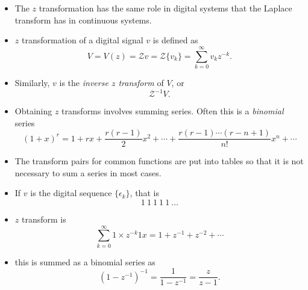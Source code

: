 \def\FileDate{98/11/04}
\def\FileVersion{1.0}

\begin{slide}\label{slide:l8s1}
\begin{itemize}
 \item The $z$ transformation has the same role in digital systems
 that the Laplace transform has in continuous systems.
 \item $z$ transformation of a digital signal $v$ is defined as \[V =
 V(z) = \mathcal{Z} v = \mathcal{Z} \{ v_{k} \}=\sum_{k=0}^{\infty}
 v_k z^{-k}.\] 

 \item Similarly, $v$ is the \emph{inverse $z$
 transform} of $V$, or
   \[\mathcal{Z}^{-1} V.\]

\end{itemize}

\end{slide}


\begin{slide}\label{slide:l8s1a}

\begin{itemize}

\item Obtaining $z$ transforms involves summing series. Often this is a
\emph{binomial} series \[(1+x)^r = 1 + rx + \frac{r(r-1)}{2}x^2 +
\cdots + \frac{r(r-1)\cdots(r-n+1)}{n!}x^n + \cdots\]

\item The transform pairs for common functions
are put into tables so that it is not necessary to sum a series in
most cases.

\end{itemize}

\end{slide}

\begin{slide}\label{slide:l8s1a1}

\begin{itemize}

\item If $v$ is the digital sequence $\{\epsilon_k\}$, that is
\[1\ 1\ 1\ 1\ 1\ \ldots\]

\item $z$ transform is
\[\sum_{k=0}^{\infty} 1\times z^{-k} 1x= 1 + z^{-1} + z^{-2}+\cdots\] 

\item this is summed
as a binomial series as \[(1-z^{-1})^{-1} = \frac{1}{1-z^{-1}} =
\frac{z}{z-1}.\] 

\end{itemize}
\end{slide}

